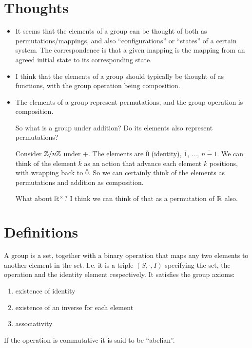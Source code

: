 \newcommand{\alphainv}{\alpha^{-1}}

\section{Thoughts}

\begin{itemize}
\item It seems that the elements of a group can be thought of both as permutations/mappings, and also ``configurations​'' or ``states​'' of a certain system. The correspondence is that a given mapping is the mapping from an agreed initial​ state to its corresponding state.
\item I think that the elements of a group should typically be thought of as functions, with the group operation
being composition.
\item The elements of a group represent permutations, and the group operation is composition.

So what is a group under addition? Do its elements also represent permutations?

Consider $\mathbb{Z}/n\mathbb{Z}$ under $+$. The elements are $\bar 0$ (identity), $\bar 1$, ..., $\bar{n - 1}$. We can think
of the element $\bar k$ as an action that advance each element $k$ positions, with wrapping back to $\bar 0$.
So we can certainly think of the elements as permutations and addition as composition.

What about $\mathbb{R}^\times$? I think we can think of that as a permutation of $\mathbb{R}$ also.
\end{itemize}





\section{Definitions}

\begin{definition*}[Group]
  A group is a set, together with a binary operation that maps any two elements
  to another element in the set. I.e. it is a triple $(S, \cdot, I)$ specifying
  the set, the operation and the identity element respectively. It satisfies the
  group axioms:
  \begin{enumerate}
  \item existence of identity
  \item existence of an inverse for each element
  \item associativity
  \end{enumerate}
  If the operation is commutative it is said to be ``abelian''.
\end{definition*}

